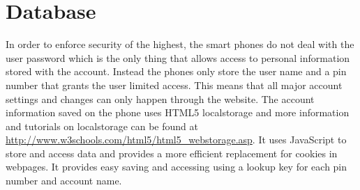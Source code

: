\documentclass[12pt]{article}
\begin{document}
\section{Database}
In order to enforce security of the highest, the smart phones do not deal with the user password which is the only thing that allows access to personal information stored with the account. Instead the phones only store the user name and a pin number that grants the user limited access. This means that all major account settings and changes can only happen through the website. The account information saved on the phone uses HTML5 localstorage and more information and tutorials on localstorage can be found at \url{http://www.w3schools.com/html5/html5_webstorage.asp}. It uses JavaScript to store and access data and provides a more efficient replacement for cookies in webpages. It provides easy saving and accessing using a lookup key for each pin number and account name.
\end{document}
